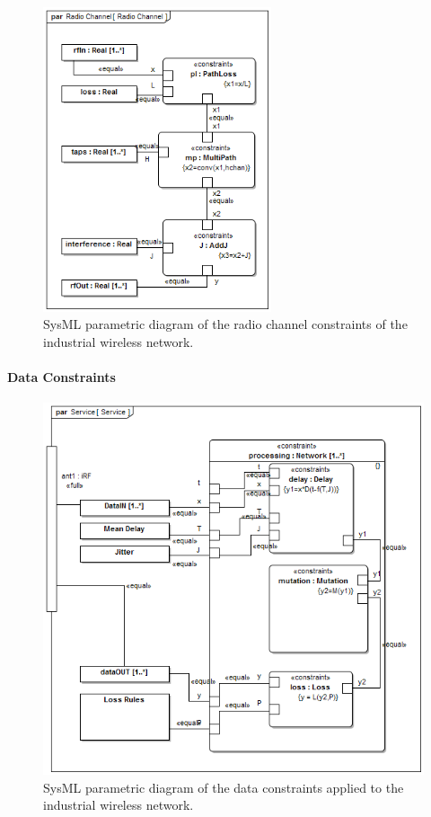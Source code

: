\begin{figure}[tbp]
	\centering
	\includegraphics[width=0.6\textwidth]{./chapter-sysml/diagrams/par__Radio_Channel__Radio_Channel}%
	\caption{SysML parametric diagram of the radio channel constraints of the industrial wireless network.}%
	\label{sysml:fig:par:iwn-radio}
\end{figure} 

\paragraph{Data Constraints}\label{sysml:sec:constraints:data}

\begin{figure}[tbp]
	\centering
	\includegraphics[width=0.8\columnwidth]{./chapter-sysml/diagrams/par__Service__Service}%
	\caption{SysML parametric diagram of the data constraints applied to the industrial wireless network.}%
	\label{sysml:fig:par:iwn:data}
\end{figure}    

